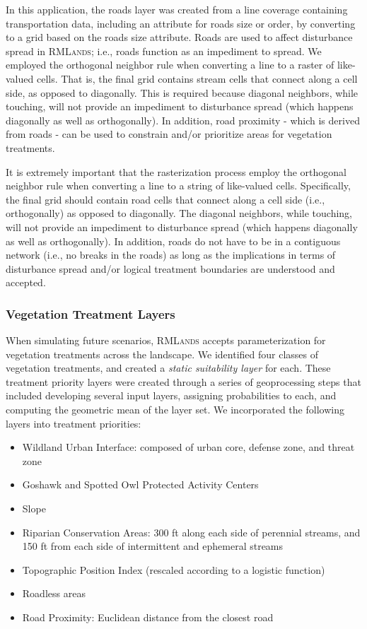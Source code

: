 In this application, the roads layer was created from a line coverage containing transportation data, including an attribute for roads size or order, by converting to a grid based on the roads size attribute. Roads are used to affect disturbance spread in \textsc{RMLands}; i.e., roads function as an impediment to spread. We employed the orthogonal neighbor rule when converting a line to a raster of like-valued cells. That is, the final grid contains stream cells that connect along a cell side, as opposed to diagonally. This is required because diagonal neighbors, while touching, will not provide an impediment to disturbance spread (which happens diagonally as well as orthogonally). In addition, road proximity - which is derived from roads - can be used to constrain and/or prioritize areas for vegetation treatments. 

It is extremely important that the rasterization process employ the orthogonal neighbor rule when converting a line to a string of like-valued cells. Specifically, the final grid should contain road cells that connect along a cell side (i.e., orthogonally) as opposed to diagonally. The diagonal neighbors, while touching, will not provide an impediment to disturbance spread (which happens diagonally as well as orthogonally). In addition, roads do not have to be in a contiguous network (i.e., no breaks in the roads) as long as the implications in terms of disturbance spread and/or logical treatment boundaries are understood and accepted. 


\subsubsection{Vegetation Treatment Layers}

When simulating future scenarios, \textsc{RMLands} accepts parameterization for vegetation treatments across the landscape. We identified four classes of vegetation treatments, and created a \emph{static suitability layer} for each. These treatment priority layers were created through a series of geoprocessing steps that included developing several input layers, assigning probabilities to each, and computing the geometric mean of the layer set. We incorporated the following layers into treatment priorities:
\begin{itemize}
	\item Wildland Urban Interface: composed of urban core, defense zone, and threat zone
	\item Goshawk and Spotted Owl Protected Activity Centers
	\item Slope
	\item Riparian Conservation Areas: 300 ft along each side of perennial streams, and 150 ft from each side of intermittent and ephemeral streams
	\item Topographic Position Index (rescaled according to a logistic function)
	\item Roadless areas
	\item Road Proximity: Euclidean distance from the closest road
\end{itemize}

